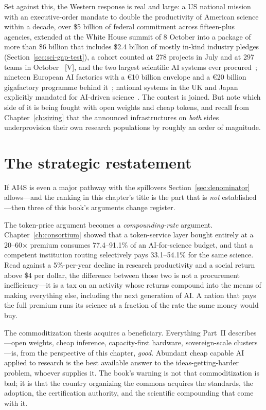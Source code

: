Set against this, the Western response is real and large: a US national mission with an executive-order mandate to double the productivity of American science within a decade, over \$5 billion of federal commitment across fifteen-plus agencies, extended at the White House summit of 8 October into a package of more than \$6 billion that includes \$2.4 billion of mostly in-kind industry pledges (Section~\ref{sec:sci-gap-test}), a cohort counted at 278 projects in July and at 297 teams in October~\cite{sci-wh-summit,sci-doe-phase2} [V], and the two largest scientific AI systems ever procured~\cite{genesis,genesis-scale,genesis-projects}; nineteen European AI factories with a €10 billion envelope and a €20 billion gigafactory programme behind it~\cite{eu-factories,eu-gigafactories}; national systems in the UK and Japan explicitly mandated for AI-driven science~\cite{isambard,fugakunext}. The contest is joined. But note which side of it is being fought with open weights and cheap tokens, and recall from Chapter~\ref{ch:sizing} that the announced infrastructures on \emph{both} sides underprovision their own research populations by roughly an order of magnitude.

\section{The strategic restatement}

If AI4S is even a major pathway with the spillovers Section~\ref{sec:denominator} allows---and the ranking in this chapter's title is the part that is \emph{not} established---then three of this book's arguments change register.

The token-price argument becomes a \emph{compounding-rate} argument. Chapter~\ref{ch:consortium} showed that a token-service layer bought entirely at a 20--60$\times$ premium consumes 77.4--91.1\% of an AI-for-science budget, and that a competent institution routing selectively pays 33.1--54.1\% for the same science. Read against a 5\%-per-year decline in research productivity and a social return above \$4 per dollar, the difference between those two is not a procurement inefficiency---it is a tax on an activity whose returns compound into the means of making everything else, including the next generation of AI. A nation that pays the full premium runs its science at a fraction of the rate the same money would buy.

The commoditization thesis acquires a beneficiary. Everything Part~II describes---open weights, cheap inference, capacity-first hardware, sovereign-scale clusters---is, from the perspective of this chapter, \emph{good}. Abundant cheap capable AI applied to research is the best available answer to the ideas-getting-harder problem, whoever supplies it. The book's warning is not that commoditization is bad; it is that the country organizing the commons acquires the standards, the adoption, the certification authority, and the scientific compounding that come with it.


